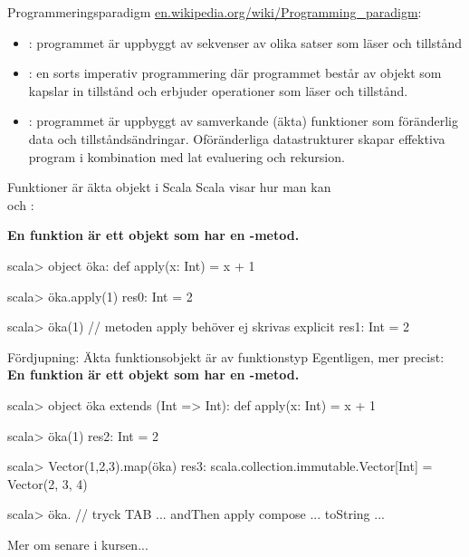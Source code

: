 
\begin{Slide}{Programmeringsparadigm}
\href{https://en.wikipedia.org/wiki/Programming_paradigm}{en.wikipedia.org/wiki/Programming\_paradigm}:
\begin{itemize}
\item {}: programmet är uppbyggt av sekvenser av olika satser som läser och  tillstånd
\item {}: en sorts imperativ programmering där programmet består av objekt som kapslar in tillstånd och erbjuder operationer som läser och  tillstånd.
\item {}: programmet är uppbyggt av samverkande (äkta) funktioner som  föränderlig data och tillståndsändringar. Oföränderliga datastrukturer skapar effektiva program i kombination med lat evaluering och rekursion.
\end{itemize}
\end{Slide}


\begin{Slide}{Funktioner är äkta objekt i Scala}
Scala visar hur man kan   \\  och : \\\vspace{0.5em}

\textbf{En funktion är ett objekt som har en -metod.}
\pause
\begin{REPLnonum}
scala> object öka:
         def apply(x: Int) = x + 1

scala> öka.apply(1)
res0: Int = 2

scala> öka(1)   // metoden apply behöver ej skrivas explicit
res1: Int = 2
\end{REPLnonum}
\end{Slide}



\begin{Slide}{Fördjupning: Äkta funktionsobjekt är av funktionstyp}
Egentligen, mer precist:\\
\textbf{En funktion är ett objekt  som har en -metod.}
\pause
\begin{REPLnonum}
scala> object öka extends (Int => Int):
         def apply(x: Int) = x + 1
 
scala> öka(1)
res2: Int = 2

scala> Vector(1,2,3).map(öka)
res3: scala.collection.immutable.Vector[Int] = Vector(2, 3, 4)

scala> öka.   // tryck TAB
... andThen   apply   compose ... toString ...
\end{REPLnonum}
Mer om  senare i kursen... %
\end{Slide}



